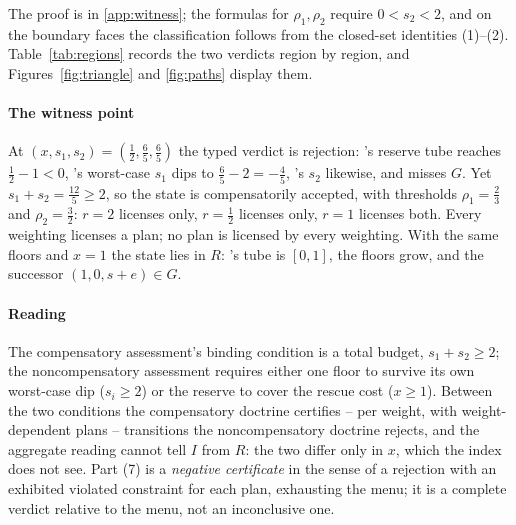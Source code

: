 The proof is in \ref{app:witness}; the formulas for $\rho_1,\rho_2$ require $0<s_2<2$, and on the boundary faces the classification follows from the closed-set identities (1)--(2). Table~\ref{tab:regions} records the two verdicts region by region, and Figures~\ref{fig:triangle} and \ref{fig:paths} display them.

\paragraph{The witness point} At $(x,s_1,s_2)=(\tfrac12,\tfrac65,\tfrac65)$ the typed verdict is rejection: 's reserve tube reaches $\tfrac12-1<0$, 's worst-case $s_1$ dips to $\tfrac65-2=-\tfrac45$, 's $s_2$ likewise, and  misses $G$. Yet $s_1+s_2=\tfrac{12}5\ge2$, so the state is compensatorily accepted, with thresholds $\rho_1=\tfrac23$ and $\rho_2=\tfrac32$: $r=2$ licenses  only, $r=\tfrac12$ licenses  only, $r=1$ licenses both. Every weighting licenses a plan; no plan is licensed by every weighting. With the same floors and $x=1$ the state lies in $R$: 's tube is $[0,1]$, the floors grow, and the successor $(1,0,s+e)\in G$.

\paragraph{Reading} The compensatory assessment's binding condition is a total budget, $s_1+s_2\ge2$; the noncompensatory assessment requires either one floor to survive its own worst-case dip ($s_i\ge2$) or the reserve to cover the rescue cost ($x\ge1$). Between the two conditions the compensatory doctrine certifies -- per weight, with weight-dependent plans -- transitions the noncompensatory doctrine rejects, and the aggregate reading cannot tell $I$ from $R$: the two differ only in $x$, which the index does not see. Part (7) is a \emph{negative certificate} in the sense of a rejection with an exhibited violated constraint for each plan, exhausting the menu; it is a complete verdict relative to the menu, not an inconclusive one.


